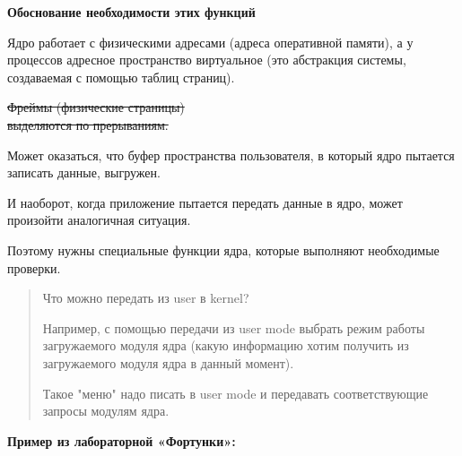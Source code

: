 \textbf{Обоснование необходимости этих функций}

Ядро работает с физическими адресами (адреса оперативной памяти), а у процессов адресное пространство виртуальное (это абстракция системы, создаваемая с помощью таблиц страниц).

\sout{Фреймы (физические страницы) \\ выделяются по прерываниям.}

Может оказаться, что буфер пространства пользователя, в который ядро пытается записать данные, выгружен.

И наоборот, когда приложение пытается передать данные в ядро, может произойти аналогичная ситуация.

Поэтому нужны специальные функции ядра, которые выполняют необходимые проверки.

\begin{quote}
Что можно передать из user в kernel?

Например, с помощью передачи из user mode выбрать режим работы загружаемого модуля ядра (какую информацию хотим получить из загружаемого модуля ядра в данный момент).

Такое "меню" надо писать в user mode и передавать соответствующие запросы модулям ядра.
\end{quote}

\textbf{Пример из лабораторной «Фортунки»:}

